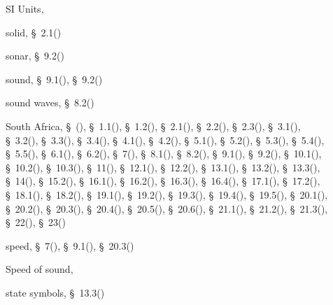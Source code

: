 \begin{multicols}{2}
{\begin{description}
	  \item[] \noindent\raggedright SI Units,  \pageref{id2398560}
	  \item[] \noindent\raggedright solid,  \S~2.1(\pageref{m38736})
	  \item[] \noindent\raggedright sonar,  \S~9.2(\pageref{m38800})
	  \item[] \noindent\raggedright sound,  \S~9.1(\pageref{m38799}),  \S~9.2(\pageref{m38800})
	  \item[] \noindent\raggedright sound waves,  \S~8.2(\pageref{m38783})
	  \item[] \noindent\raggedright South Africa,  \S~(\pageref{m30853}),  \S~1.1(\pageref{m38708}),  \S~1.2(\pageref{m38706}),  \S~2.1(\pageref{m38736}),  \S~2.2(\pageref{m38734}),  \S~2.3(\pageref{m38730}),  \S~3.1(\pageref{m38756}),  \S~3.2(\pageref{m38745}),  \S~3.3(\pageref{m38753}),  \S~3.4(\pageref{m38741}),  \S~4.1(\pageref{m38760}),  \S~4.2(\pageref{m38757}),  \S~5.1(\pageref{m38704}),  \S~5.2(\pageref{m38701}),  \S~5.3(\pageref{m38684}),  \S~5.4(\pageref{m38694}),  \S~5.5(\pageref{m38689}),  \S~6.1(\pageref{m38801}),  \S~6.2(\pageref{m38802}),  \S~7(\pageref{m38806}),  \S~8.1(\pageref{m38782}),  \S~8.2(\pageref{m38783}),  \S~9.1(\pageref{m38799}),  \S~9.2(\pageref{m38800}),  \S~10.1(\pageref{m38777}),  \S~10.2(\pageref{m38778}),  \S~10.3(\pageref{m38779}),  \S~11(\pageref{m38120}),  \S~12.1(\pageref{m38709}),  \S~12.2(\pageref{m38711}),  \S~13.1(\pageref{m38721}),  \S~13.2(\pageref{m38726}),  \S~13.3(\pageref{m38727}),  \S~14(\pageref{m37830}),  \S~15.2(\pageref{m38781}),  \S~16.1(\pageref{m38771}),  \S~16.2(\pageref{m38772}),  \S~16.3(\pageref{m38773}),  \S~16.4(\pageref{m38776}),  \S~17.1(\pageref{m38720}),  \S~17.2(\pageref{m38719}),  \S~18.1(\pageref{m38717}),  \S~18.2(\pageref{m38712}),  \S~19.1(\pageref{m38812}),  \S~19.2(\pageref{m38813}),  \S~19.3(\pageref{m38815}),  \S~19.4(\pageref{m38816}),  \S~19.5(\pageref{m38819}),  \S~20.1(\pageref{m38787}),  \S~20.2(\pageref{m38788}),  \S~20.3(\pageref{m38791}),  \S~20.4(\pageref{m38794}),  \S~20.5(\pageref{m38795}),  \S~20.6(\pageref{m38796}),  \S~21.1(\pageref{m38784}),  \S~21.2(\pageref{m38785}),  \S~21.3(\pageref{m38786}),  \S~22(\pageref{m38138}),  \S~23(\pageref{m38491})
	  \item[] \noindent\raggedright speed,  \S~7(\pageref{m38806}),  \S~9.1(\pageref{m38799}),  \S~20.3(\pageref{m38791})
	  \item[] \noindent\raggedright Speed of sound,  \pageref{id2448438}
	  \item[] \noindent\raggedright state symbols,  \S~13.3(\pageref{m38727})

\end{description}}
\end{multicols}
